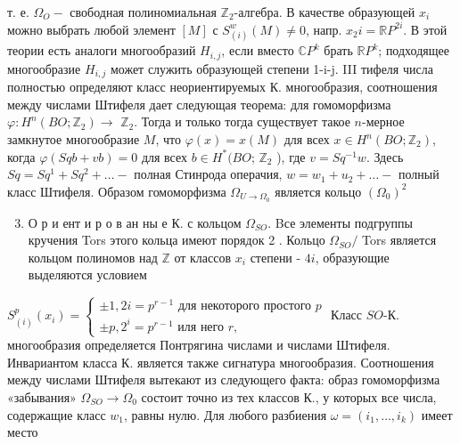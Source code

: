 \documentclass[10pt]{article}
\begin{document}
т. е. $\Omega_{O}-$ свободная полиномиальная $\mathbb{Z}_{2}$-алгебра. В качестве образующей $x_{i}$ можно выбрать любой элемент $[M]$ с $S_{(i)}^{w}(M) \neq 0$, напр. $x_{2} i=\mathbb{R} P^{2 i}$. В этой теории есть аналоги многообразий $H_{i, j}$, если вместо $\mathbb{C} P^{k}$ брать $\mathbb{R} P^{k}$; подходящее многообразие $H_{i, j}$ может служить образующей степени 1-i-j. III тифеля числа полностью определяют класс неориентируемых К. многообразия, соотношения между числами Штифеля дает следующая теорема: для гомоморфизма $\varphi: H^{n}\left(B O ; \mathbb{Z}_{2}\right) \rightarrow$ $\mathbb{Z}_{2}$. Тогда и только тогда существует такое $n$-мерное замкнутое многообразие $M$, что $\varphi(x)=x(M)$ для всех $x \in H^{n}\left(B O ; \mathbb{Z}_{2}\right)$, когда $\varphi(S q b+v b)=0$ для всех $b \in H^{*}(B O$; $\mathbb{Z}_{2}$ ), где $v=S q^{-1} w$. Здесь $S q=S q^{1}+S q^{2}+\ldots-$ полная Стинрода операчия, $w=w_{1}+u_{2}+\ldots-$ полный класс Штифеля. Образом гомоморфизма $\Omega_{U \rightarrow \Omega_{0}}$ является кольцо $\left(\Omega_{0}\right)^{2}$



\begin{enumerate}

  \setcounter{enumi}{2}

  \item О р и ент и р о в ан ны е К. с кольцом $\Omega_{S O}$. Bсе элементы подгруппы кручения Tors этого кольца имеют порядок 2 . Кольцо $\Omega_{S O} /$ Tors является кольцом полиномов над $\mathbb{Z}$ от классов $x_{i}$ степени - $4 i$, образующие выделяются условием

\end{enumerate}



$S_{(i)}^{p}\left(x_{i}\right)=\left\{\begin{array}{l} \pm 1,2 i=p^{r-1} \text { для некоторого простого } p \\ \pm p, 2^{i}=p^{r-1} \text { иля него } r,\end{array}\right.$ Класс $S O$-К. многообразия определяется Понтрягина числами и числами Штифеля. Инвариантом класса К. является также сигнатура многообразия. Соотношения между числами Штифеля вытекают из следующего факта: образ гомоморфизма «забывания» $\Omega_{S O} \rightarrow \Omega_{0}$ состоит точно из тех классов К., у которых все числа, содержащие класс $w_{1}$, равны нулю. Для любого разбиения $\omega=\left(i_{1}, \ldots, i_{k}\right)$ имеет место
\end{document}
